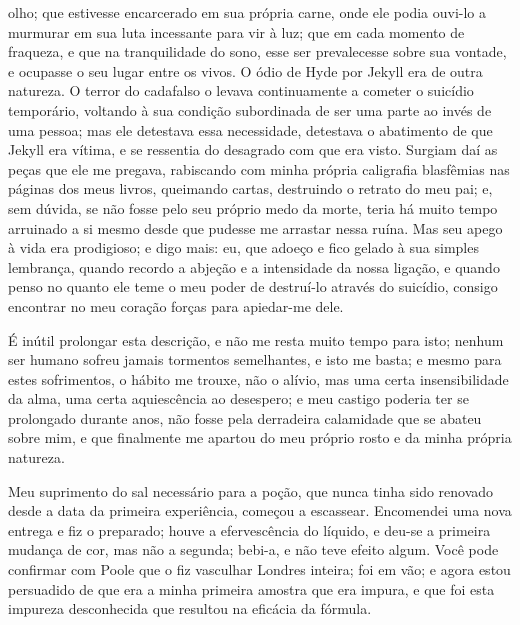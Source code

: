 olho; que estivesse encarcerado em sua própria carne, onde ele podia
ouvi-lo a murmurar em sua luta incessante para vir à luz; que em cada
momento de fraqueza, e que na tranquilidade do sono, esse ser
prevalecesse sobre sua vontade, e ocupasse o seu lugar entre os vivos. 
O ódio de Hyde por Jekyll era de outra natureza. O terror do cadafalso
o levava continuamente a cometer o suicídio temporário, voltando à sua
condição subordinada de ser uma parte ao invés de uma pessoa; mas ele
detestava essa necessidade, detestava o abatimento de que Jekyll era
vítima, e se ressentia do desagrado com que era visto.  Surgiam daí as
peças que ele me pregava, rabiscando com minha própria caligrafia
blasfêmias nas páginas dos meus livros, queimando cartas, destruindo o
retrato do meu pai; e, sem dúvida, se não fosse pelo seu próprio medo
da morte, teria há muito tempo arruinado a si mesmo desde que pudesse
me arrastar nessa ruína. Mas seu apego à vida era prodigioso; e digo
mais: eu, que adoeço e fico gelado à sua simples lembrança, quando
recordo a abjeção e a intensidade da nossa ligação, e quando penso no
quanto ele teme o meu poder de destruí-lo através do suicídio, consigo
encontrar no meu coração forças para apiedar-me dele.

É inútil prolongar esta descrição, e não me resta muito tempo para isto;
nenhum ser humano sofreu jamais tormentos semelhantes, e isto me basta;
e mesmo para estes sofrimentos, o hábito me trouxe, não o alívio, mas
uma certa insensibilidade da alma, uma certa aquiescência ao desespero;
e meu castigo poderia ter se prolongado durante anos, não fosse pela
derradeira calamidade que se abateu sobre mim, e que finalmente me
apartou do meu próprio rosto e da minha própria natureza.  

Meu suprimento do sal necessário para a poção, que nunca tinha sido
renovado desde a data da primeira experiência, começou a escassear. 
Encomendei uma nova entrega e fiz o preparado; houve a efervescência do
líquido, e deu-se a primeira mudança de cor, mas não a segunda; bebi-a,
e não teve efeito algum.  Você pode confirmar com Poole que o fiz
vasculhar Londres inteira; foi em vão; e agora estou persuadido de que
era a minha primeira amostra que era impura, e que foi esta impureza
desconhecida que resultou na eficácia da fórmula.

